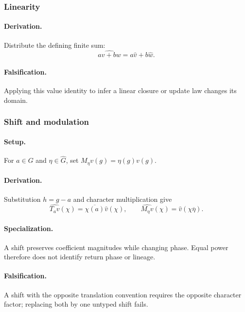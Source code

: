 \subsubsection{Linearity}
\paragraph{Derivation.}
Distribute the defining finite sum:
\begin{equation}
\widehat{av+bw}=a\widehat v+b\widehat w.
\label{eq:fourier-linearity}
\end{equation}
\paragraph{Falsification.} Applying this value identity to infer a linear
closure or update law changes its domain.


\subsubsection{Shift and modulation}
\paragraph{Setup.}
For \(a\in G\) and \(\eta\in\widehat G\), set \(M_\eta v(g)=\eta(g)v(g)\).
\paragraph{Derivation.}
Substitution \(h=g-a\) and character multiplication give
\begin{equation}
\widehat{T_a v}(\chi)=\overline{\chi(a)}\widehat v(\chi),
\qquad \widehat{M_\eta v}(\chi)=\widehat v(\chi\overline\eta).
\label{eq:fourier-shift-modulation}
\end{equation}
\paragraph{Specialization.} A shift preserves coefficient magnitudes while
changing phase. Equal power therefore does not identify return phase or lineage.
\paragraph{Falsification.} A shift with the opposite translation convention
requires the opposite character factor; replacing both by one untyped shift fails.

